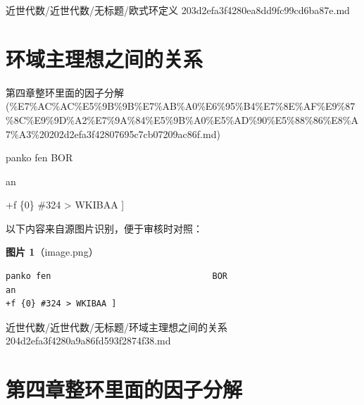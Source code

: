 \begin{note}[来源路径]

近世代数/近世代数/无标题/欧式环定义 203d2efa3f4280ea8dd9fc99cd6ba87e.md

\end{note}

\section*{环域主理想之间的关系}

\begin{note}[来源上级主题]

第四章整环里面的因子分解 (\%E7\%AC\%AC\%E5\%9B\%9B\%E7\%AB\%A0\%E6\%95\%B4\%E7\%8E\%AF\%E9\%87\%8C\%E9\%9D\%A2\%E7\%9A\%84\%E5\%9B\%A0\%E5\%AD\%90\%E5\%88\%86\%E8\%A7\%A3\%20202d2efa3f42807695c7cb07209ac86f.md)

\end{note}

\begin{note}[环域主理想之间的关系]

panko fen                                BOR

an

+f \{0\} \#324 > WKIBAA ]

\end{note}

\begin{note}
以下内容来自源图片识别，便于审核时对照：

\textbf{图片 1}（image.png）
\begin{Verbatim}[fontsize=\small]
panko fen                                BOR
an
+f {0} #324 > WKIBAA ]
\end{Verbatim}

\end{note}

\begin{note}[来源路径]

近世代数/近世代数/无标题/环域主理想之间的关系 204d2efa3f4280a9a86fd593f2874f38.md

\end{note}

\section*{第四章整环里面的因子分解}

